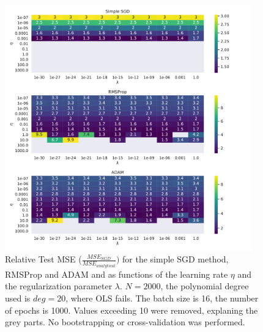 \documentclass[11pt,a4paper,titlepage]{article}
\begin{document}
\begin{figure}[H]
\centering
\includegraphics[width=0.95\textwidth]{Ridge_error_SGD.pdf}
\caption[Relative Test MSE with different SGD methods for Ridge]{Relative Test MSE  ($\frac{MSE_{SGD}}{MSE_{analytical}})$ for the simple SGD method, RMSProp and ADAM and as functions of the learning rate $\eta$ and the regularization parameter $\lambda$. $N=2000$, the polynomial degree used is $deg=20$, where OLS fails. The batch size is 16, the number of epochs is 1000. Values exceeding 10 were removed, explaning the grey parts. No bootstrapping or cross-validation was performed.} \label{fig:DifferentSGDRIDE}
\end{figure}
\end{document}
